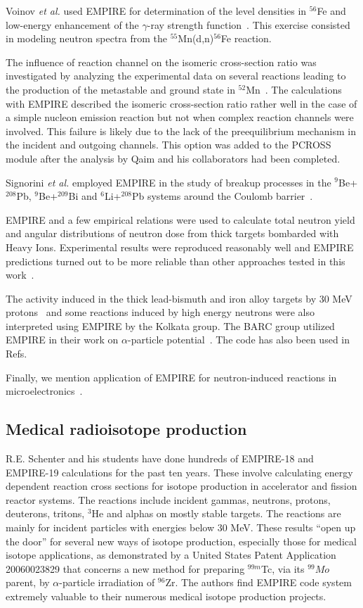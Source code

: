 \documentclass[twocolumn,amsmath,amssymb,10pt,groupedaddress,a4paper]{revtex4}
\begin{document}
Voinov \textit{et al.} used EMPIRE for determination of the level densities in $^{56}$Fe
and low-energy enhancement of the $\gamma$-ray strength function~\cite{Voinov:06}.
This exercise consisted in modeling neutron spectra from the $^{55}$Mn(d,n)$^{56}$Fe reaction.

The influence of reaction channel on the isomeric cross-section ratio was investigated by analyzing the experimental data on several reactions leading to the production of the metastable and ground state in $^{52}$Mn~\cite{Qaim:05}. The calculations with EMPIRE described the isomeric cross-section ratio rather well in the
case of a simple nucleon emission reaction but not when
complex reaction channels were involved. This failure is likely due to the lack of the preequilibrium mechanism in the incident and outgoing channels. This option was added to the PCROSS module after the analysis by Qaim and his collaborators had been completed.

Signorini \textit{et al.} employed EMPIRE in the study of breakup processes in the $^9$Be+$^{208}$Pb, $^9$Be+$^{209}$Bi and $^6$Li+$^{208}$Pb systems around the Coulomb barrier~\cite{signorini2004bps}.

EMPIRE and a few empirical relations were used to calculate total neutron yield and angular distributions of neutron dose from thick targets bombarded with Heavy Ions. Experimental results were reproduced reasonably well and EMPIRE predictions turned out to be more reliable than other approaches tested in this work~\cite{Nandy:07}.

The  activity induced in the thick lead-bismuth and iron alloy targets by 30 MeV protons~\cite{Nandy:07a} and some reactions induced by high energy neutrons were also interpreted using EMPIRE by the Kolkata group. The BARC group utilized EMPIRE in their work on $\alpha$-particle potential~\cite{Kumar:06}. The code  has also been used in Refs.~\cite{Said:06, Elmaghraby:06, Pandey:07}

Finally, we mention application of EMPIRE  for neutron-induced reactions in microelectronics~\cite{wrobel2005unc}.
\subsection{Medical radioisotope production}
R.E. Schenter and his students have done hundreds of EMPIRE-18 and EMPIRE-19 calculations for the past ten years.  These involve calculating energy dependent reaction cross sections for isotope production in accelerator and fission reactor systems.   The reactions include incident gammas, neutrons, protons, deuterons, tritons, $^3$He and alphas on mostly stable targets. The reactions are mainly for incident particles with energies below 30 MeV.  These results “open up the door” for several new ways of isotope production, especially those for medical isotope applications, as demonstrated by a United States Patent Application 20060023829 that concerns a new method for preparing $^{99m}$Tc, via its $^{99}Mo$ parent, by $\alpha$-particle irradiation of $^{96}$Zr. The authors find EMPIRE code system extremely valuable to their numerous medical isotope  production projects.
\end{document}
